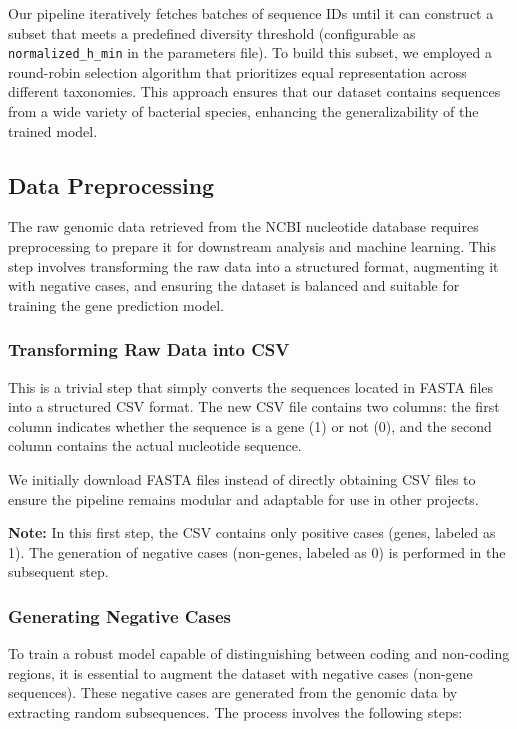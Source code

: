 \documentclass[
	a4paper, %
	10pt, %
	unnumberedsections, %
	twoside, %
]{LTJournalArticle}
\begin{document}
Our pipeline iteratively fetches batches of sequence IDs until it can construct a subset that meets a predefined diversity threshold (configurable as \texttt{normalized\_h\_min} in the parameters file). To build this subset, we employed a round-robin selection algorithm that prioritizes equal representation across different taxonomies. This approach ensures that our dataset contains sequences from a wide variety of bacterial species, enhancing the generalizability of the trained model.

\subsection{Data Preprocessing}

The raw genomic data retrieved from the NCBI nucleotide database requires preprocessing to prepare it for downstream analysis and machine learning. This step involves transforming the raw data into a structured format, augmenting it with negative cases, and ensuring the dataset is balanced and suitable for training the gene prediction model.

\subsubsection{Transforming Raw Data into CSV}

This is a trivial step that simply converts the sequences located in FASTA files into a structured CSV format. The new CSV file contains two columns: the first column indicates whether the sequence is a gene (1) or not (0), and the second column contains the actual nucleotide sequence.

We initially download FASTA files instead of directly obtaining CSV files to ensure the pipeline remains modular and adaptable for use in other projects.

\textbf{Note:} In this first step, the CSV contains only positive cases (genes, labeled as 1). The generation of negative cases (non-genes, labeled as 0) is performed in the subsequent step.

\subsubsection{Generating Negative Cases}

To train a robust model capable of distinguishing between coding and non-coding regions, it is essential to augment the dataset with negative cases (non-gene sequences). These negative cases are generated from the genomic data by extracting random subsequences. The process involves the following steps:
\end{document}
